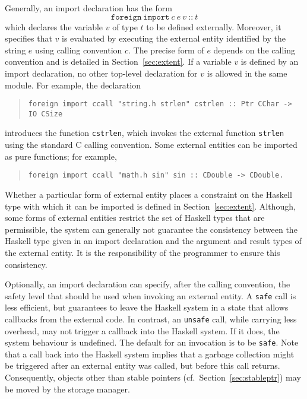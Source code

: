 \documentclass[a4paper,twosides]{article}
\newcommand{\code}[1]{\texttt{#1}}
\begin{document}
Generally, an import declaration has the form
%
\[
\code{foreign}~\code{import}~c~e~v~\code{{::}}~t
\]
%
which declares the variable $v$ of type $t$ to be defined externally.
Moreover, it specifies that $v$ is evaluated by executing the external entity
identified by the string $e$ using calling convention $c$.  The precise form
of $e$ depends on the calling convention and is detailed in
Section~\ref{sec:extent}.  If a variable $v$ is defined by an import
declaration, no other top-level declaration for $v$ is allowed in the same
module.  For example, the declaration
%
\begin{quote}
\begin{verbatim}
foreign import ccall "string.h strlen" cstrlen :: Ptr CChar -> IO CSize
\end{verbatim}
\end{quote}
%
introduces the function \code{cstrlen}, which invokes the external function
\code{strlen} using the standard C calling convention.  Some external entities
can be imported as pure functions; for example,
%
\begin{quote}
\begin{verbatim}
foreign import ccall "math.h sin" sin :: CDouble -> CDouble.
\end{verbatim}
\end{quote}
%
Whether a particular form of external entity places a constraint on the
Haskell type with which it can be imported is defined in
Section~\ref{sec:extent}.  Although, some forms of external entities restrict
the set of Haskell types that are permissible, the system can generally not
guarantee the consistency between the Haskell type given in an import
declaration and the argument and result types of the external entity.  It is
the responsibility of the programmer to ensure this consistency.

Optionally, an import declaration can specify, after the calling convention,
the safety level that should be used when invoking an external entity.  A
\code{safe} call is less efficient, but guarantees to leave the Haskell system
in a state that allows callbacks from the external code.  In contrast, an
\code{unsafe} call, while carrying less overhead, may not trigger a callback
into the Haskell system.  If it does, the system behaviour is undefined.  The
default for an invocation is to be \code{safe}.  Note that a call back into
the Haskell system implies that a garbage collection might be triggered after
an external entity was called, but before this call returns.  Consequently,
objects other than stable pointers (cf.\ Section~\ref{sec:stableptr}) may be
moved by the storage manager.
\end{document}
